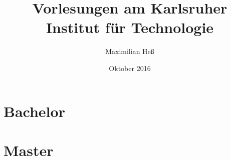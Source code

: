 \documentclass[a4paper,8pt,titlepage]{scrbook}
\title{Vorlesungen am Karlsruher Institut für Technologie}
\author{Maximilian Heß}
\date{Oktober 2016}
\begin{document}
\maketitle
\tableofcontents

\part{Bachelor}










\part{Master}










\end{document}
